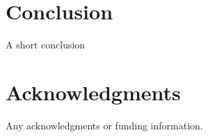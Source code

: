 \section{Conclusion}
\label{sec:conclusion}

A short conclusion

\section*{Acknowledgments}
Any acknowledgments or funding information.
